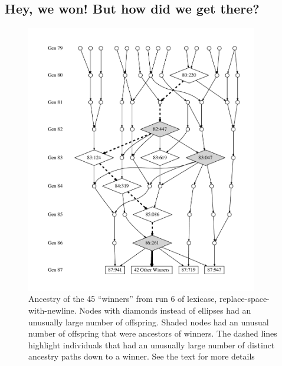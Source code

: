 \subsection{Hey, we won! But how did we get there?}

\begin{figure}[tp]
	\begin{center}
	\includegraphics[width=0.9\textwidth]{figures/ancestors_of_winners_colons.pdf}
	\end{center}
	\caption{Ancestry of the 45 ``winners'' from run 6 of lexicase, replace-space-with-newline. Nodes
		with diamonds instead of ellipses had an unusually large number of offspring. Shaded nodes
		had an unusual number of offspring that were ancestors of winners. The dashed lines highlight
		individuals that had an unusually large number of distinct ancestry paths down to a winner.
		See the text for more details}
	\label{fig:winnerAncestors}
\end{figure}

